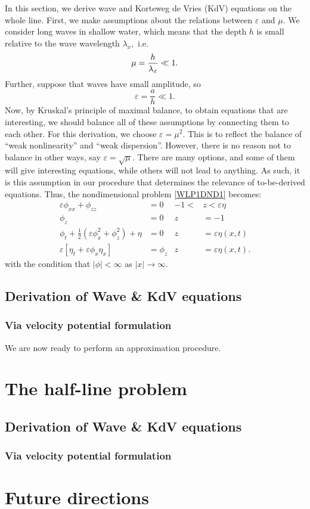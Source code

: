 \documentclass[10pt,reqno,oneside,a4paper]{article}
\begin{document}
In this section, we derive wave and Korteweg de Vries (KdV) equations on the whole line. First, we make assumptions about the relations between $\varepsilon$ and $\mu.$ We consider long waves in shallow water, which means that the depth $h$ is small relative to the wave wavelength $\lambda_x,$ i.e.
\[ \mu = \dfrac{h}{\lambda_x} \ll 1.\]
Further, suppose that waves have small amplitude, so 
\[ \varepsilon = \frac{a}{h} \ll 1. \]
Now, by Kruskal's principle of maximal balance, to obtain equations that are interesting, we should balance all of these assumptions by connecting them to each other. For this derivation, we choose $\varepsilon = \mu^2.$ This is to reflect the balance of ``weak nonlinearity'' and ``weak dispersion''. However, there is no reason not to balance in other ways, say $\varepsilon = \sqrt{\mu}.$ There are many options, and some of them will give interesting equations, while others will not lead to anything. As such, it is this assumption in our procedure that determines the relevance of to-be-derived equations. Thus, the nondimensional problem \eqref{WLP1DND1} becomes:
\begin{subequations}\label{WLP1DND2}
\begin{align}
\label{1PDEND2}  \varepsilon\phi_{xx} + \phi_{zz} &= 0 &-1 <&z < \varepsilon\eta \\
\label{1BC1ND2} \phi_z &= 0 &z &= -1  \\ 
\label{1BC2ND2} \phi_{t} + \frac{1}{2} \left(\varepsilon\phi_{x}^2 + \phi_{z}^2\right) + \eta &= 0 &z &= \varepsilon\eta(x,t)\\
\label{1BC3ND2} \varepsilon\left[\eta_{t} + \varepsilon \phi_{x} \eta_{x}\right] &= \phi_{z} &z &= \varepsilon\eta(x,t).
\end{align}
\end{subequations}
with the condition that $|\phi| < \infty$ as $|x|\to \infty.$

\subsection{Derivation of Wave \& KdV equations}

\subsubsection{Via velocity potential formulation}
We are now ready to perform an approximation procedure. 
\section{The half-line problem}

\subsection{Derivation of Wave \& KdV equations}

\subsubsection{Via velocity potential formulation}

\section{Future directions}

{\small}
\end{document}
